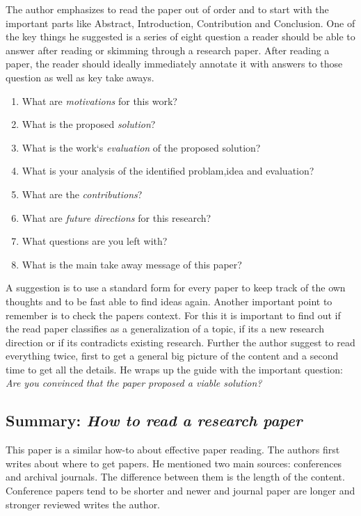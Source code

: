 \documentclass{article}
\begin{document}
  The author emphasizes to read the paper out of order and to start with the important parts like Abstract, 
  Introduction, Contribution and Conclusion. One of the key things he suggested is a series of eight question 
  a reader should be able to answer after reading or skimming through a research paper. After reading a paper,
  the reader should ideally immediately annotate it with answers to those question as well as key take aways.
  \begin{enumerate}
    \item What are \emph{motivations} for this work?
    \item What is the proposed \emph{solution}?
    \item What is the work`s \emph{evaluation} of the proposed solution?
    \item What is your analysis of the identified problam,idea and evaluation?
    \item What are the \emph{contributions}?
    \item What are \emph{future directions} for this research? 
    \item What questions are you left with?
    \item What is the main take away message of  this paper?
  \end{enumerate}
A suggestion is to use a standard form for every paper to keep track of the own thoughts and to be fast able to 
find ideas again. Another important point to remember is to check the papers context.
For this it is important to find out if the read paper classifies as a generalization of a topic, if its a
new research direction or if its contradicts existing research.
Further the author suggest to read everything twice, first to get a general big picture of the content and a second
time to get all the details.
He wraps up the guide with the important question: \emph{Are you convinced that the paper proposed a viable solution?}

\subsection*{Summary: \emph{How to read a research paper}}

This paper \cite{Huang} is a similar how-to about effective paper reading.
The authors first writes about where to get papers. He mentioned two main sources: conferences and archival journals. The 
difference between them is the length of the content. Conference papers tend to be shorter and newer and journal paper are longer 
and stronger reviewed writes the author.
\end{document}
